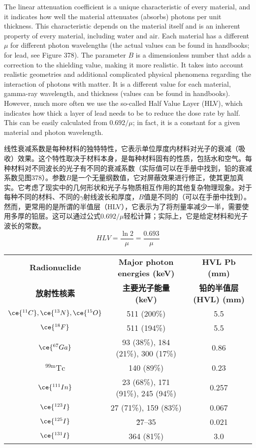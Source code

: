 \documentclass[dvipsnames, svgnames,a4paper,11pt]{article}
\begin{document}
The linear attenuation coefficient is a unique characteristic of every material, and it indicates how well the material attenuates (absorbs) photons per unit thickness. This characteristic depends on the material itself and is an inherent property of every material, including water and air. Each material has a different \(\mu\) for different photon wavelengths (the actual values can be found in handbooks; for lead, see Figure 378). The parameter \(B\) is a dimensionless number that adds a correction to the shielding value, making it more realistic. It takes into account realistic geometries and additional complicated physical phenomena regarding the interaction of photons with matter. It is a different value for each material, gamma-ray wavelength, and thickness (values can be found in handbooks). However, much more often we use the so-called Half Value Layer (HLV), which indicates how thick a layer of lead needs to be to reduce the dose rate by half. This can be easily calculated from \(0.692/\mu\); in fact, it is a constant for a given material and photon wavelength.

线性衰减系数是每种材料的独特特性，它表示单位厚度内材料对光子的衰减（吸收）效果。这个特性取决于材料本身，是每种材料固有的性质，包括水和空气。每种材料对不同波长的光子有不同的衰减系数（实际值可以在手册中找到，铅的衰减系数见图378）。参数\(B\)是一个无量纲数值，它对屏蔽效果进行修正，使其更加真实。它考虑了现实中的几何形状和光子与物质相互作用的其他复杂物理现象。对于每种不同的材料、不同的$\gamma$射线波长和厚度，\(B\)值是不同的（可以在手册中找到）。然而，更常用的是所谓的半值层（HLV），它表示为了将剂量率减少一半，需要使用多厚的铅层。这可以通过公式\(0.692/\mu\)轻松计算；实际上，它是给定材料和光子波长的常数。
\[
HLV=\frac{\ln2}{\mu} =\frac{0.693}{\mu}
\]

\begin{table}[h!]
\centering
{}\label{table9}
\begin{tabular}{ccc}
\toprule
\textbf{Radionuclide} & \textbf{ Major photon energies (keV)} & \textbf{ HVL Pb (mm)} \\
\textbf{放射性核素} & \textbf{主要光子能量 (keV)} & \textbf{铅的半值层 (HVL) (mm)} \\
\midrule
\(\ce{^{11}C}, \ce{^{13}N}, \ce{^{15}O}\) & 511 (200\%) & 5.5 \\
\(\ce{^{18}F}\) & 511 (194\%) & 5.5 \\
\(\ce{^{67}Ga}\) & 93 (38\%), 184 (21\%), 300 (17\%) & 0.86 \\
\(\mathrm{^{99m}Tc}\) & 140 (89\%) & 0.23 \\
\(\ce{^{111}In}\) & 23 (68\%), 171 (91\%), 245 (94\%) & 0.257 \\
\(\ce{^{123}I}\) & 27 (71\%), 159 (83\%) & 0.067 \\
\(\ce{^{125}I}\) & \~ 27–35 & 0.021 \\
\(\ce{^{131}I}\) & 364 (81\%) & 3.0 \\
\bottomrule
\end{tabular}
\end{table}
\end{document}
